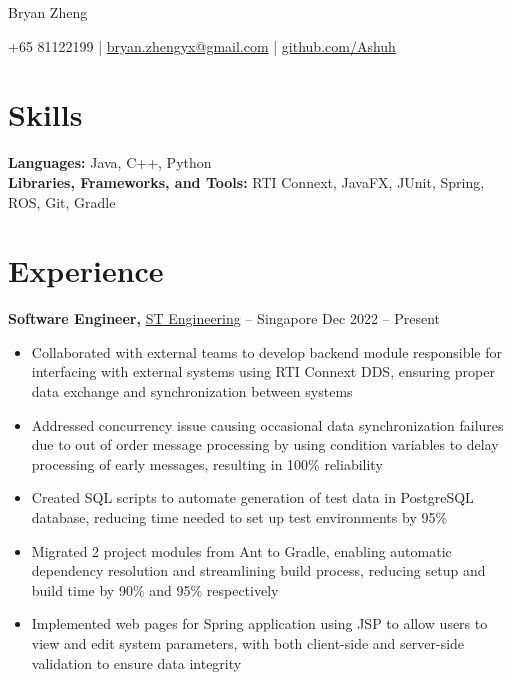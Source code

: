 \documentclass[11pt]{article}       %
\begin{document}
\centerline{\Huge Bryan Zheng}

\vspace{5pt}

\centerline{+65 81122199 | \href{mailto:bryan.zhengyx@gmail.com}{bryan.zhengyx@gmail.com} | \href{https://github.com/Ashuh}{github.com/Ashuh}}

\vspace{-10pt}

\section*{Skills}
\textbf{Languages:} Java, C++, Python \\
\textbf{Libraries, Frameworks, and Tools:} RTI Connext, JavaFX, JUnit, Spring, ROS, Git, Gradle

\vspace{-6.5pt}

\section*{Experience}
\textbf{Software Engineer,} \href{https://www.stengg.com/}{ST Engineering} -- Singapore \hfill Dec 2022 -- Present \\
\vspace{-9pt}
\begin{itemize}
  \item Collaborated with external teams to develop backend module responsible for interfacing with external systems using RTI Connext DDS, ensuring proper data exchange and synchronization between systems
  \item Addressed concurrency issue causing occasional data synchronization failures due to out of order message processing by using condition variables to delay processing of early messages, resulting in 100\% reliability
  \item Created SQL scripts to automate generation of test data in PostgreSQL database, reducing time needed to set up test environments by 95\%
  \item Migrated 2 project modules from Ant to Gradle, enabling automatic dependency resolution and streamlining build process, reducing setup and build time by 90\% and 95\% respectively
  \item Implemented web pages for Spring application using JSP to allow users to view and edit system parameters, with both client-side and server-side validation to ensure data integrity
\end{itemize}
\end{document}
